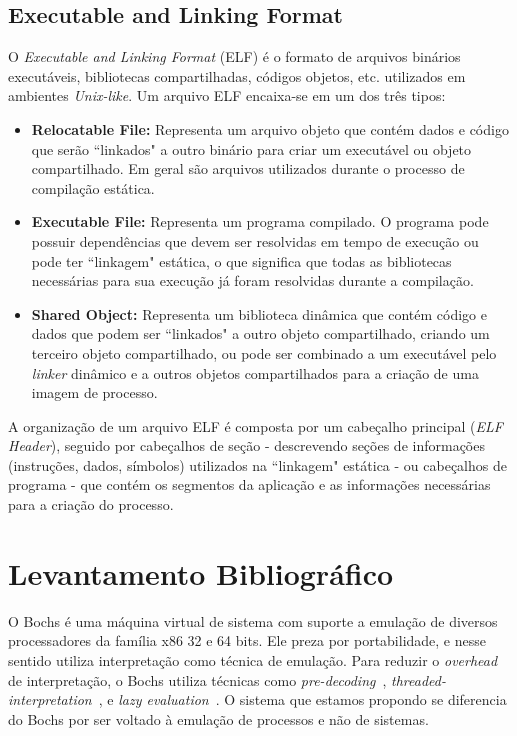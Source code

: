 \documentclass[11pt,twoside]{article}
\begin{document}
\subsection{Executable and Linking Format}

O \emph{Executable and Linking Format} (ELF) \cite{SCO1997} é o formato de arquivos binários executáveis, 
bibliotecas compartilhadas, códigos objetos, etc. utilizados em ambientes \textit{Unix-like}. Um arquivo ELF
encaixa-se em um dos três tipos:

\begin{itemize}
 	\item \textbf{Relocatable File:} Representa um arquivo objeto que contém dados e código que serão ``linkados" 
 	a outro binário para criar um executável ou objeto compartilhado. Em geral são arquivos utilizados durante
 	o processo de compilação estática.
 
 	\item \textbf{Executable File:} Representa um programa compilado. O programa pode possuir dependências que
 	devem ser resolvidas em tempo de execução ou pode ter ``linkagem" estática, o que significa que todas as bibliotecas
 	necessárias para sua execução já foram resolvidas durante a compilação.
 
 	\item \textbf{Shared Object:} Representa um biblioteca dinâmica que contém código e dados que podem ser 
 	``linkados" a outro objeto compartilhado, criando um terceiro objeto compartilhado, ou pode ser combinado a 
 	um executável pelo \textit{linker} dinâmico e a outros objetos compartilhados para a criação de uma imagem de processo.
\end{itemize}

A organização de um arquivo ELF é composta por um cabeçalho principal (\emph{ELF Header}), seguido por cabeçalhos 
de seção - descrevendo seções de informações (instruções, dados, símbolos) utilizados na ``linkagem" estática - ou cabeçalhos 
de programa - que contém os segmentos da aplicação e as informações necessárias para a criação do processo. 







\section{Levantamento Bibliográfico}  \label{sec:bibliografia}

O Bochs \cite{bochs} é uma máquina virtual de sistema com suporte a emulação 
de diversos processadores da família x86 32 e 64 bits. Ele preza por portabilidade, 
e nesse sentido utiliza interpretação como técnica de emulação. Para reduzir o 
\textit{overhead} de interpretação, o Bochs utiliza técnicas como \emph{pre-decoding}~\cite{Magnusson1994}, 
\emph{threaded-interpretation}~\cite{Klint1981}, e \emph{lazy evaluation}~\cite{Hookway1997}.
O sistema que estamos propondo se diferencia do Bochs por ser voltado à emulação 
de processos e não de sistemas.
\end{document}
